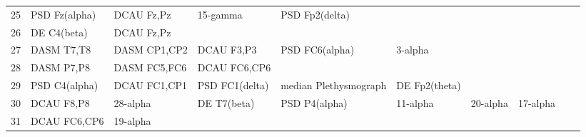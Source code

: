 \begin{landscape}
\begin{table}[]
\begin{tabular}{l|llllllll}
25       & PSD Fz(alpha)         & DCAU Fz,Pz            & 15-gamma             & PSD Fp2(delta)          &                         &                      &                      &                       &                       &                    \\
26       & DE C4(beta)           & DCAU Fz,Pz            &                      &                         &                         &                      &                      &                       &                       &                    \\
27       & DASM T7,T8            & DASM CP1,CP2          & DCAU F3,P3           & PSD FC6(alpha)          & 3-alpha                 &                      &                      &                       &                       &                    \\
28       & DASM P7,P8            & DASM FC5,FC6          & DCAU FC6,CP6         &                         &                         &                      &                      &                       &                       &                    \\
29       & PSD C4(alpha)         & DCAU FC1,CP1          & PSD FC1(delta)       & median Plethysmograph   & DE Fp2(theta)           &                      &                      &                       &                       &                    \\
30       & DCAU F8,P8            & 28-alpha              & DE T7(beta)          & PSD P4(alpha)           & 11-alpha                & 20-alpha             & 17-alpha             &                       &                       &                    \\
31       & DCAU FC6,CP6          & 19-alpha              &                      &                         &                         &                      &                      &                       &                       &                    \\
\end{tabular}
\end{table}
\end{landscape}
\clearpage
